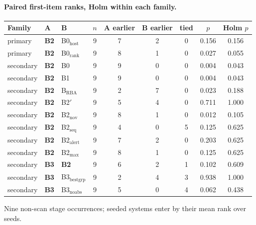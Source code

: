 \documentclass[10.5pt,a4paper]{article}
\begin{document}
\paragraph{Paired first-item ranks, Holm within each family.}
\begin{center}\small
\begin{tabular}{@{}l l l c c c c c c@{}}
\toprule
Family & A & B & $n$ & A earlier & B earlier & tied & $p$ & Holm $p$ \\
\midrule
primary & \textbf{B2} & B0$_\mathrm{host}$ & 9 & 7 & 2 & 0 & 0.156 & 0.156 \\
primary & \textbf{B2} & B0$_\mathrm{rank}$ & 9 & 8 & 1 & 0 & 0.027 & 0.055 \\
secondary & \textbf{B2} & B0 & 9 & 9 & 0 & 0 & 0.004 & 0.043 \\
secondary & \textbf{B2} & B1 & 9 & 9 & 0 & 0 & 0.004 & 0.043 \\
secondary & \textbf{B2} & B$_\mathrm{RBA}$ & 9 & 2 & 7 & 0 & 0.023 & 0.188 \\
secondary & \textbf{B2} & B2$'$ & 9 & 5 & 4 & 0 & 0.711 & 1.000 \\
secondary & \textbf{B2} & B2$_\mathrm{nov}$ & 9 & 8 & 1 & 0 & 0.012 & 0.105 \\
secondary & \textbf{B2} & B2$_\mathrm{seq}$ & 9 & 4 & 0 & 5 & 0.125 & 0.625 \\
secondary & \textbf{B2} & B2$_\mathrm{alert}$ & 9 & 7 & 2 & 0 & 0.203 & 0.625 \\
secondary & \textbf{B2} & B2$_\mathrm{max}$ & 9 & 8 & 1 & 0 & 0.125 & 0.625 \\
secondary & \textbf{B3} & \textbf{B2} & 9 & 6 & 2 & 1 & 0.102 & 0.609 \\
secondary & \textbf{B3} & B3$_\mathrm{bestgrp}$ & 9 & 2 & 4 & 3 & 0.938 & 1.000 \\
secondary & \textbf{B3} & B3$_\mathrm{noabs}$ & 9 & 5 & 0 & 4 & 0.062 & 0.438 \\
\bottomrule
\end{tabular}
\par\smallskip\footnotesize Nine non-scan stage occurrences; seeded systems enter by their mean rank over seeds.
\end{center}
\end{document}
